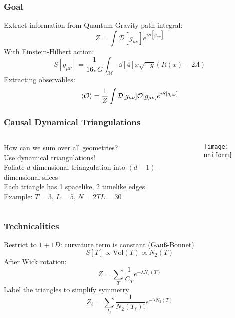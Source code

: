 
\begin{frame}
    \frametitle{Goal}
    Extract information from Quantum Gravity path integral:
    \begin{equation}
        Z = \int \mathcal{D}[g_{\mu \nu}] e^{i S[g_{\mu \nu}]}
    \end{equation}
    With Einstein-Hilbert action:
    \begin{equation}
        S[g_{\mu \nu}]
        =
        \frac{1}{16 \pi G}
        \int_\mathcal{M} \dd[4]{x} \sqrt{-g}
        (R(x) - 2 \Lambda)
    \end{equation}
    Extracting observables:
    \begin{equation}
        \ev{\mathcal{O}}
        =
        \frac{1}{Z} \int \mathcal{D}[g_{\mu \nu}]
        \mathcal{O}[g_{\mu \nu}]
        e^{i S[g_{\mu \nu}]}
    \end{equation}
\end{frame}

\begin{frame}
    \frametitle{Causal Dynamical Triangulations}
    \begin{columns}
        \begin{column}{0.7\textwidth}
            How can we sum over all geometries? \\
            Use dynamical triangulations! \\
            Foliate $d$-dimensional triangulation into $(d - 1)$-dimensional slices \\
            Each triangle has 1 spacelike, 2 timelike edges \\
            Example: $T = 3$, $L = 5$, $N = 2TL = 30$
        \end{column}
        \begin{column}{0.3\textwidth}
            \texttt{[image: uniform]}
        \end{column}
    \end{columns}
\end{frame}

\begin{frame}
    \frametitle{Technicalities}
    Restrict to $1 + 1D$: curvature term is constant (Gau\ss -Bonnet) \\
    \begin{equation}
        S[T] \propto \text{Vol}(T) \propto N_2(T)
    \end{equation}
    After Wick rotation:
    \begin{equation}
        Z = \sum_{T} \frac{1}{C_T} e^{-\lambda N_2(T)}
    \end{equation}
    Label the triangles to simplify symmetry
    \begin{equation}
        Z_\ell = \sum _{T_\ell} \frac{1}{N_2(T_\ell)!} e^{-\lambda N_2(T)}
    \end{equation}
\end{frame}